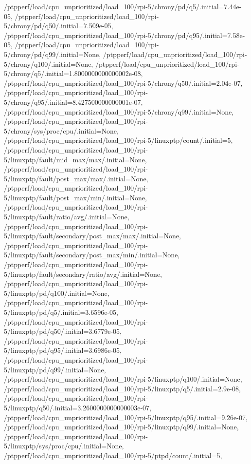 {    /ptpperf/load/cpu_unprioritized/load_100/rpi-5/chrony/pd/q5/.initial=7.44e-05,
    /ptpperf/load/cpu_unprioritized/load_100/rpi-5/chrony/pd/q50/.initial=7.509e-05,
    /ptpperf/load/cpu_unprioritized/load_100/rpi-5/chrony/pd/q95/.initial=7.58e-05,
    /ptpperf/load/cpu_unprioritized/load_100/rpi-5/chrony/pd/q99/.initial=None,
    /ptpperf/load/cpu_unprioritized/load_100/rpi-5/chrony/q100/.initial=None,
    /ptpperf/load/cpu_unprioritized/load_100/rpi-5/chrony/q5/.initial=1.8000000000000002e-08,
    /ptpperf/load/cpu_unprioritized/load_100/rpi-5/chrony/q50/.initial=2.04e-07,
    /ptpperf/load/cpu_unprioritized/load_100/rpi-5/chrony/q95/.initial=8.427500000000001e-07,
    /ptpperf/load/cpu_unprioritized/load_100/rpi-5/chrony/q99/.initial=None,
    /ptpperf/load/cpu_unprioritized/load_100/rpi-5/chrony/sys/proc/cpu/.initial=None,
    /ptpperf/load/cpu_unprioritized/load_100/rpi-5/linuxptp/count/.initial=5,
    /ptpperf/load/cpu_unprioritized/load_100/rpi-5/linuxptp/fault/mid_max/max/.initial=None,
    /ptpperf/load/cpu_unprioritized/load_100/rpi-5/linuxptp/fault/post_max/max/.initial=None,
    /ptpperf/load/cpu_unprioritized/load_100/rpi-5/linuxptp/fault/post_max/min/.initial=None,
    /ptpperf/load/cpu_unprioritized/load_100/rpi-5/linuxptp/fault/ratio/avg/.initial=None,
    /ptpperf/load/cpu_unprioritized/load_100/rpi-5/linuxptp/fault/secondary/post_max/max/.initial=None,
    /ptpperf/load/cpu_unprioritized/load_100/rpi-5/linuxptp/fault/secondary/post_max/min/.initial=None,
    /ptpperf/load/cpu_unprioritized/load_100/rpi-5/linuxptp/fault/secondary/ratio/avg/.initial=None,
    /ptpperf/load/cpu_unprioritized/load_100/rpi-5/linuxptp/pd/q100/.initial=None,
    /ptpperf/load/cpu_unprioritized/load_100/rpi-5/linuxptp/pd/q5/.initial=3.6596e-05,
    /ptpperf/load/cpu_unprioritized/load_100/rpi-5/linuxptp/pd/q50/.initial=3.6779e-05,
    /ptpperf/load/cpu_unprioritized/load_100/rpi-5/linuxptp/pd/q95/.initial=3.6986e-05,
    /ptpperf/load/cpu_unprioritized/load_100/rpi-5/linuxptp/pd/q99/.initial=None,
    /ptpperf/load/cpu_unprioritized/load_100/rpi-5/linuxptp/q100/.initial=None,
    /ptpperf/load/cpu_unprioritized/load_100/rpi-5/linuxptp/q5/.initial=2.9e-08,
    /ptpperf/load/cpu_unprioritized/load_100/rpi-5/linuxptp/q50/.initial=3.2600000000000003e-07,
    /ptpperf/load/cpu_unprioritized/load_100/rpi-5/linuxptp/q95/.initial=9.26e-07,
    /ptpperf/load/cpu_unprioritized/load_100/rpi-5/linuxptp/q99/.initial=None,
    /ptpperf/load/cpu_unprioritized/load_100/rpi-5/linuxptp/sys/proc/cpu/.initial=None,
    /ptpperf/load/cpu_unprioritized/load_100/rpi-5/ptpd/count/.initial=5,
}
